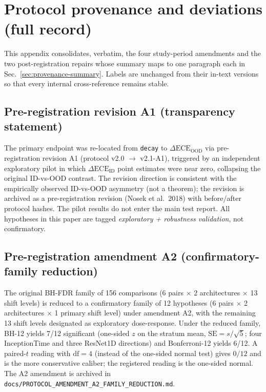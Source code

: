 \documentclass[final,5p,times,nonatbib]{elsarticle}
\begin{document}
\appendix

\section{Protocol provenance and deviations (full record)}
\label{app:provenance}

This appendix consolidates, verbatim, the four study-period
amendments and the two post-registration repairs whose summary maps
to one paragraph each in Sec.~\ref{sec:provenance-summary}. Labels
are unchanged from their in-text versions so that every internal
cross-reference remains stable.

\subsection{Pre-registration revision A1 (transparency statement)}
The primary endpoint was re-located from \texttt{decay} to
$\Delta\text{ECE}_{\text{OOD}}$ via pre-registration revision A1
(protocol v2.0 $\rightarrow$ v2.1-A1), triggered by an independent
exploratory pilot in which $\Delta\text{ECE}_{\text{ID}}$ point
estimates were near zero, collapsing the original ID-vs-OOD contrast.
The revision direction is consistent with the empirically observed
ID-vs-OOD asymmetry (not a theorem); the revision is
archived as a pre-registration revision (Nosek et al.\ 2018) with
before/after protocol hashes. The pilot results do not enter the
main test report. All hypotheses in this paper are tagged
\emph{exploratory + robustness validation}, not confirmatory.

\subsection{Pre-registration amendment A2 (confirmatory-family reduction)}
\label{sec:a2}
The original
BH-FDR family of 156 comparisons (6 pairs $\times$ 2 architectures
$\times$ 13 shift levels) is reduced to a confirmatory family of 12
hypotheses (6 pairs $\times$ 2 architectures $\times$ 1 primary shift
level) under amendment A2, with the remaining 13 shift levels
designated as exploratory dose-response. Under the reduced family,
BH-12 yields 7/12 significant (one-sided $z$ on the stratum mean,
$\mathrm{SE}=s/\sqrt{5}$; four InceptionTime and three ResNet1D
directions) and Bonferroni-12 yields 6/12. A paired-$t$ reading with
$\mathrm{df}{=}4$ (instead of the one-sided normal test) gives $0/12$
and is the more conservative caliber; the registered reading is the
one-sided normal. The A2 amendment is archived in
\texttt{docs/PROTOCOL\_AMENDMENT\_A2\_}\allowbreak\texttt{FAMILY\_REDUCTION.md}.
\end{document}
